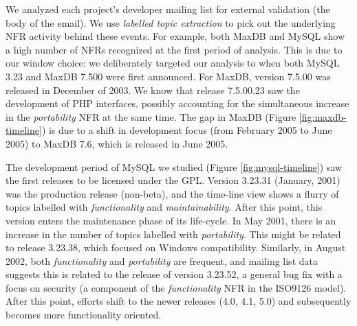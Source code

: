 \documentclass[smallextended]{svjour3}       %
\begin{document}

We analyzed each project's developer mailing list for external validation (the body of the email).
We use \textit{labelled topic extraction} to pick out the underlying NFR activity behind these events. 
For example, both MaxDB and MySQL show a high number of NFRs recognized at the first period of analysis. 
This is due to our window choice: we deliberately targeted our
analysis to when both MySQL 3.23
and MaxDB 7.500 were first announced. For MaxDB, version 7.5.00  was released in December of 2003. 
We know that release 7.5.00.23 saw the development of PHP interfaces, possibly accounting for the simultaneous increase in the \emph{portability}
NFR at the same time.
The gap in MaxDB (Figure \ref{fig:maxdb-timeline}) is due to a shift in development focus (from February 2005 to June 2005) to MaxDB 7.6, which is
released in June 2005.

The development period of MySQL we studied  (Figure \ref{fig:mysql-timeline}) saw the first releases to be licensed under the GPL. 
Version 3.23.31 (January, 2001) was the production release (non-beta), and the time-line view shows a flurry of topics labelled with \emph{functionality} and
\emph{maintainability}. 
After this point, this version enters the maintenance phase of its life-cycle. 
In May 2001, there is an increase in the number of topics labelled with \emph{portability}. 
This might be related to release 3.23.38, which focused on Windows compatibility. 
Similarly, in August 2002, both \emph{functionality} and \emph{portability} are frequent, and mailing list data suggests this is related to the release
of version 3.23.52, a general bug fix with a focus on security (a component of the \emph{functionality} NFR in the ISO9126 model). 
After this point, efforts shift to the newer releases (4.0, 4.1, 5.0) and subsequently becomes more functionality oriented. 
\end{document}
